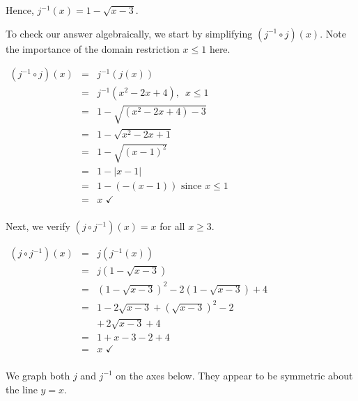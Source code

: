 \documentclass{ximera}
\begin{document}
\begin{example}
\begin{explanation}
\begin{enumerate}
Hence, $j^{-1}(x) = 1 - \sqrt{x-3}$.

To check our answer algebraically, we start by simplifying $(j^{-1} \circ j)(x)$. Note the importance of the domain restriction  $x \leq 1$ here.


\begin{center}

$\begin{array}{rcl}
\left(j^{-1} \circ j \right)(x) & = & j^{-1}(j(x)) \\ 
& = & j^{-1}\left(x^2-2x+4\right), \, \, \, x \leq 1 \\
& = & 1 - \sqrt{\left(x^2-2x+4\right)-3}  \\
& = & 1 - \sqrt{x^2-2x+1}  \\
& = & 1 - \sqrt{(x-1)^2} \\
& = & 1 - |x-1|  \\
& = & 1 - (-(x-1)) \, \,  \text{since $x \leq 1$}\\
& = & x \, \, \checkmark \\
\end{array}$

\end{center}

Next, we verify $\left(j \circ j^{-1} \right)(x) = x$ for all $x \geq 3$.

\begin{center}
$\begin{array}{rcl}
\left(j \circ j^{-1} \right)(x) & = & j\left(j^{-1}(x)\right)  \\ 
& = & j\left(1 - \sqrt{x-3}\right)  \\
& = & \left(1 - \sqrt{x-3}\right)^2-2\left(1 - \sqrt{x-3}\right)+4  \\
& = & 1 - 2\sqrt{x-3} + \left(\sqrt{x-3}\right)^2 -2 \\
&      & + \, 2\sqrt{x-3}+4  \\
& = & 1+ x-3 -2 +4 \\
& = &  x \, \, \checkmark \\
\end{array}$  

\end{center}

We graph both $j$ and $j^{-1}$ on the axes below.  They appear to be symmetric about the line $y=x$.

\begin{center}
\end{center}



\end{enumerate}
\end{explanation}
\end{example}
\end{document}
